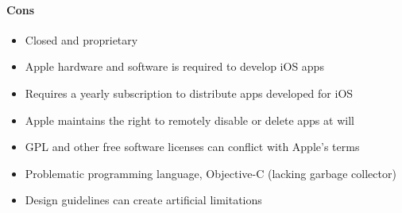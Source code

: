 	\paragraph{Cons}
		\begin{itemize}
			\item Closed and proprietary
			\item Apple hardware and software is required to develop iOS apps
			\item Requires a yearly subscription to distribute apps developed
			for iOS
			\item Apple maintains the right to remotely disable or delete apps
			at will
			\item GPL and other free software licenses can conflict with
			Apple's terms
			\item Problematic programming language, Objective-C (lacking garbage collector)
			\item Design guidelines can create artificial limitations
		\end{itemize}



